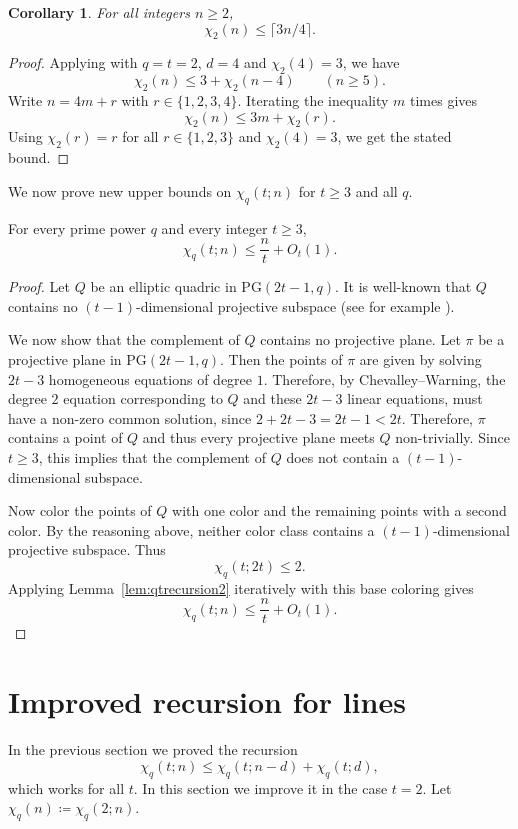 \documentclass[11pt]{article}
\theoremstyle{plain}
\newtheorem{corollary}{Corollary}
\newcommand{\PG}{\mathrm{PG}}
\newenvironment{reptheorem}[1]{%
  \renewcommand\theinnerthm{\ref*{#1}}%
  \innerthm
}{\endinnerthm}
\begin{document}
\begin{corollary}\label{cor:chi2-3n4}
For all integers $n\ge 2$,
\[
  \chi_2(n) \le \lceil 3n/4 \rceil.
\]
\end{corollary}
\begin{proof}
Applying  with $q=t=2$, $d=4$ and $\chi_2(4)=3$, we have
\[
\chi_2(n)\le 3+\chi_2(n-4) \qquad (n\ge 5).
\]
Write $n=4m+r$ with $r\in\{1,2,3,4\}$.
Iterating the inequality $m$ times gives
\[
\chi_2(n)\le 3m + \chi_2(r).
\]
Using $\chi_2(r) = r$ for all $r \in \{1, 2, 3\}$ and $\chi_2(4)=3$, we get the stated bound.
\end{proof}
We now prove new upper bounds on $\chi_q(t;n)$ for $t\ge3$ and all $q$. 
\begin{reptheorem}{thm:chiq-upper-bound_t}
For every prime power $q$ and every integer $t\ge3$,
\[
    \chi_q(t;n) \le \frac{n}{t}+O_t(1).
\]
\end{reptheorem}
\begin{proof}
Let $Q$ be an elliptic quadric in $\PG(2t-1,q)$.
It is well-known that $Q$ contains no $(t-1)$-dimensional projective subspace (see for example \cite[Section 4.2]{Ball2015}).

We now show that the complement of $Q$ contains no projective plane.
Let $\pi$ be a projective plane in $\PG(2t-1,q)$.
Then the points of $\pi$ are given by solving $2t-3$ homogeneous equations of degree $1$. 
Therefore, by Chevalley--Warning, the degree $2$ equation corresponding to $Q$ and these $2t - 3$ linear equations, must have a non-zero common solution, since $2 + 2t - 3 = 2t - 1 < 2t$. Therefore, $\pi$ contains a point of $Q$ and thus every projective plane meets $Q$ non-trivially. 
Since $t \geq 3$, this implies that the complement of $Q$ does not contain a $(t - 1)$-dimensional subspace.

Now color the points of $Q$ with one color and the remaining points with a
second color.
By the reasoning above, neither color class contains a
$(t-1)$-dimensional projective subspace.
Thus
\[
    \chi_q(t;2t)\le2.
\]
Applying Lemma~\ref{lem:qtrecursion2} iteratively with this base coloring gives
\[
    \chi_q(t;n)\le \frac{n}{t}+O_t(1).
\]
\end{proof}

\section{Improved recursion for lines}\label{sec:recursion}
In the previous section we proved the recursion
\[
    \chi_q(t;n) \le \chi_q(t;n-d)+\chi_q(t;d),
\]
which works for all $t$.
In this section we improve it in the case $t=2$.
Let $\chi_q(n) \coloneqq \chi_q(2;n)$.
\end{document}
